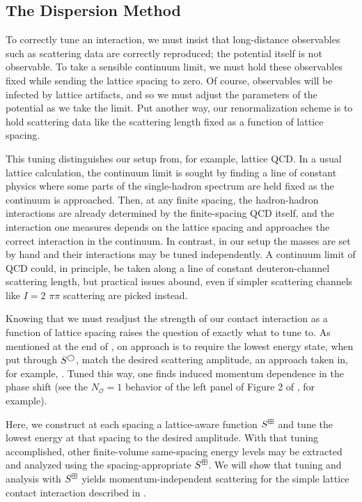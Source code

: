 \subsection{The Dispersion Method}\label{sec:dispersion}

To correctly tune an interaction, we must insist that long-distance observables such as scattering data are correctly reproduced; the potential itself is not observable.
To take a sensible continuum limit, we must hold these observables fixed while sending the lattice spacing to zero.
Of course, observables will be infected by lattice artifacts, and so we must adjust the parameters of the potential as we take the limit.
Put another way, our renormalization scheme is to hold scattering data like the scattering length fixed as a function of lattice spacing.

This tuning distinguishes our setup from, for example, lattice QCD.
In a usual lattice calculation, the continuum limit is sought by finding a line of constant physics where some parts of the single-hadron spectrum are held fixed as the continuum is approached.
Then, at any finite spacing, the hadron-hadron interactions are already determined by the finite-spacing QCD itself, and the interaction one measures depends on the lattice spacing and approaches the correct interaction in the continuum.
In contrast, in our setup the masses are set by hand and their interactions may be tuned independently.
A continuum limit of QCD could, in principle, be taken along a line of constant deuteron-channel scattering length, but practical issues abound, even if simpler scattering channels like $I=2$ $\pi\pi$ scattering are picked instead.

Knowing that we must readjust the strength of our contact interaction as a function of lattice spacing raises the question of exactly what to tune to.
As mentioned at the end of , on approach is to require the lowest energy state, when put through $S^{\bigcirc}$, match the desired scattering amplitude, an approach taken in, for example, .
Tuned this way, one finds induced momentum dependence in the phase shift (see the $N_\mathcal{O}=1$ behavior of the left panel of Figure 2 of , for example).

Here, we construct at each spacing a lattice-aware function $S^{\boxplus}$ and tune the lowest energy at that spacing to the desired amplitude.
With that tuning accomplished, other finite-volume same-spacing energy levels may be extracted and analyzed using the spacing-appropriate $S^{\boxplus}$.
We will show that tuning and analysis with $S^{\boxplus}$ yields momentum-independent scattering for the simple lattice contact interaction described in .

